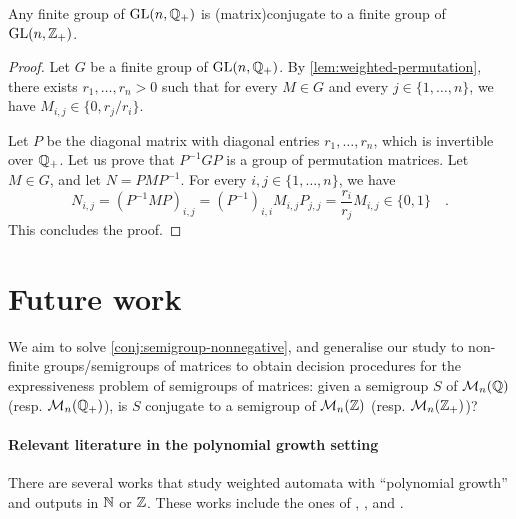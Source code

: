 \begin{theorem}
  \label{thm:group-nonnegative}
  Any finite group of $\GL[n]{\Rat_+}$ is \kl(matrix){conjugate} to a finite group of
  $\GL[n]{\Int_+}$.
\end{theorem}
\begin{proof}
  Let $G$ be a finite group of $\GL[n]{\Rat_+}$.
  By \cref{lem:weighted-permutation}, there exists $r_1, \ldots, r_n > 0$ such that
  for every $M \in G$ and every $j \in \{1,
  \ldots, n\}$, we have $M_{i,j} \in \{0, r_j/r_i\}$.

  Let $P$ be the diagonal matrix with diagonal entries $r_1, \ldots, r_n$,
  which is invertible over $\Rat_+$.
  Let us prove that $P^{-1} G P$ is a group of permutation matrices.
  Let $M \in G$, and let $N = P M P^{-1}$.
  For every $i, j \in \{1, \ldots, n\}$, we have
  \begin{equation}
    N_{i,j} = (P^{-1} M P)_{i,j}
    = (P^{-1})_{i,i} M_{i,j} P_{j,j}
    = \frac{r_i}{r_j} M_{i,j} \in \{0, 1\}
    \quad .
  \end{equation}  
  This concludes the proof.
\end{proof}

\section{Future work}

We aim to solve \cref{conj:semigroup-nonnegative}, and generalise our study to
non-finite groups/semigroups of matrices to obtain decision procedures for the
expressiveness problem of semigroups of matrices: given a semigroup $S$ of
$\Mat[n]{\Rat}$ (resp. $\Mat[n]{\Rat_+}$), is $S$ conjugate to a semigroup of
$\Mat[n]{\Int}$ (resp. $\Mat[n]{\Int_+}$)?


\paragraph*{Relevant literature in the polynomial growth setting} There are
several works that study weighted automata with ``polynomial growth'' and
outputs in $\Nat$ or $\Int$. These works include the ones of \cite{KRRC13},
\cite{CDTL23}, and \cite{LOPEZ25}.


